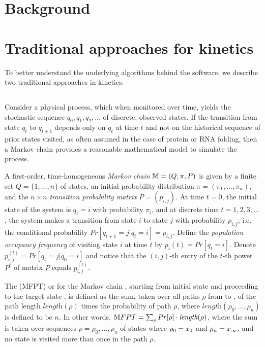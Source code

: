 \section{Background}
\label{sec:hermes:bkgrnd}

\section{Traditional approaches for kinetics}
\label{sec:hermes:kinetics}

To better understand the underlying algorithms behind the software,
we describe two traditional approaches in kinetics.

\subsection{\Mfpt}
\label{subsec:hermes:mfpt}

Consider a physical process,
which when monitored over time, yields the stochastic sequence
$q_0,q_1,q_2,\dots$ of discrete, observed states. If the transition from
state $q_t$ to $q_{t+1}$ depends only on $q_t$ at time
$t$ and not on the historical sequence of prior states visited,
as often assumed in the case of protein or
RNA folding, then a Markov chain provides a reasonable
mathematical model to simulate the process.

A first-order, time-homogeneous
{\em Markov chain} $\mathbb{M} = (Q,\pi,P)$ is given by a finite
set $Q = \{ 1,\dots,n \}$ of states, an initial probability distribution
$\pi = (\pi_1,\dots,\pi_n)$, and the $n \times n$
{\em transition probability matrix} $P = (p_{i,j})$.
At time $t=0$, the initial state of the system is
$q_t=i$ with probability $\pi_i$, and at discrete time
$t=1,2,3,\dots$, the system makes a transition from state
$i$ to state $j$ with probability $p_{i,j}$; i.e.
the conditional probability $Pr[ q_{t+1} = j | q_t=i] = p_{i,j}$.
Define the {\em population occupancy frequency} of visiting state
$i$ at time $t$ by $p_{i}(t) = Pr[q_t=i]$.  Denote
$p_{i,j}^{(t)} = Pr[q_t = j | q_0 = i]$ and notice that
the $(i,j)$-th entry of the $t$-th power $P^t$ of matrix $P$  equals
$p_{i,j}^{(t)}$.

The {\em \mfpt} (MFPT) or
{\em \hit} for the Markov chain \mChain,
starting from initial state \xStart and proceeding
to the target state \xEnd, is defined
as the sum, taken over all paths $\rho$
from \xStart to \xEnd, of the path length $\textit{length}(\rho)$
times the probability
of path $\rho$, where $\textit{length}(\rho_0,\dots,\rho_n)$ is defined to
be $n$. In other words,
${\text MFPT} = \sum_{\rho} Pr[\rho] \cdot \textit{length}(\rho)$, where
the sum is taken over sequences $\rho=\rho_0,\dots,\rho_n$ of states
where $\rho_0=x_0$ and $\rho_n=x_\infty$, and no state is visited more
than once in the path $\rho$.

